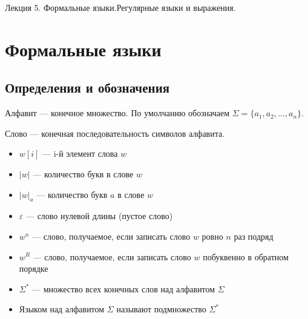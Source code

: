\documentclass[11pt]{article}
\begin{document}
\begin{titlepage}
    \centering
    \vspace*{\fill}  %

    {\Huge Лекция 5. Формальные языки.Регулярные языки и выражения.  
    \par}

    \vspace*{\fill}  %
\end{titlepage}

\setcounter{page}{1}

\section{Формальные языки}

\subsection{Определения и обозначения}

\begin{definition}
    Алфавит --- конечное множество. По умолчанию обозначаем $\Sigma = \{a_1,a_2,...,a_n\} $.
\end{definition}

\begin{definition}
    Слово --- конечная последовательность символов алфавита.
\end{definition}

\begin{itemize}
    \item $w[i]$ --- i-й элемент слова $w$
    \item $|w| $ --- количество букв в слове $w$
    \item $|w|_a $ --- количество букв $a$ в слове $w$
    \item $\varepsilon$ --- слово нулевой длины (пустое слово)
    \item $w^n$ --- слово, получаемое, если записать слово $w$ ровно $n$ раз подряд
    \item $w^R$ --- слово, получаемое, если записать слово $w$  побуквенно в обратном порядке
    \item $\Sigma^*$ --- множество всех конечных слов над алфавитом $\Sigma$
    \item Языком над алфавитом $\Sigma$ называют подмножество $\Sigma^*$
\end{itemize}
\end{document}
